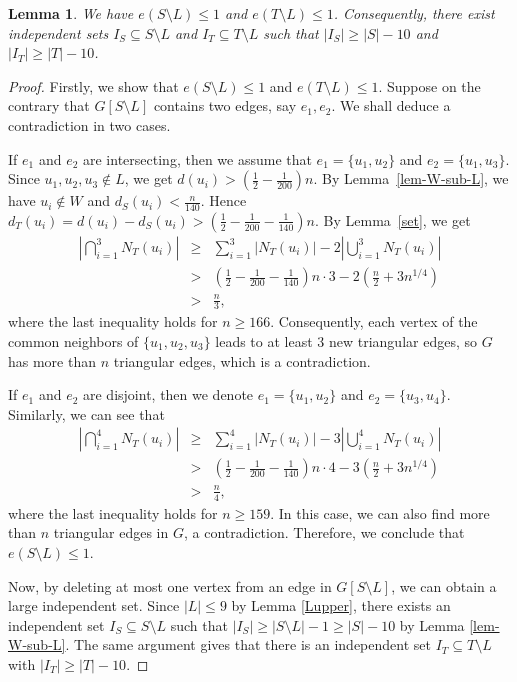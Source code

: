 \documentclass[11pt]{article}
\newtheorem{lemma}[theorem]{Lemma}
\begin{document}
\begin{lemma}  \label{lem-one-edge}
We have 
$e(S\setminus L) \le 1$ and $e(T\setminus L) \le 1$. 
Consequently, 
there exist  independent sets
 $I_S\subseteq S\setminus L$  and $I_T\subseteq T\setminus L$ such that
$ |I_S|\ge  |S|-10$
   and 
$|I_T|\ge |T|-10 $. 
 \end{lemma}

\begin{proof}
Firstly, we show that $e(S\setminus L) \le 1$ and $e(T\setminus L) \le 1$. 
Suppose on the contrary that 
 $G[S\setminus L]$ contains two edges, say $e_1,e_2$.  
 We shall deduce a contradiction in two cases. 
 
If $e_1$ and $e_2$ are intersecting, then we assume that 
$e_1=\{u_1,u_2\}$ and $e_2=\{u_1,u_3\}$. 
Since $u_1, u_2, u_{3} \notin L$, we get  
$d(u_i)> \left(\frac{1}{2}-\frac{1}{200} \right)n$.
By Lemma~\ref{lem-W-sub-L}, we have $u_i \notin W$ and 
$d_S(u_i)<  \frac{n}{140}$. Hence
$d_T(u_i)=d(u_i)-d_S(u_i)> \left(\frac{1}{2}-\frac{1}{200}-\frac{1}{140}\right)n.$
By Lemma~\ref{set}, we  get 
    \begin{eqnarray*}
\left |\bigcap_{i=1}^{3}N_T(u_i) \right| &\ge &  \sum_{i=1}^{3}|N_T(u_i)|-2 \left|\bigcup_{i=1}^{3}N_T(u_i) \right| \\
& > & \left (\frac{1}{2}-\frac{1}{200}-\frac{1}{140} \right)n\cdot 3 - 
2 \left(\frac{n}{2}+ 3n^{1/4} \right) \\
 &>& \frac{n}{3}, 
\end{eqnarray*}
where the last inequality holds for $n\ge 166$. 
Consequently, each vertex of the common neighbors of 
$\{u_1,u_2,u_3\}$ leads to at least $3$ new triangular edges,  so $G$ has more than $n$ triangular edges, which is a contradiction. 


If $e_1$ and $e_2$ are disjoint, then we denote 
$e_1=\{u_1,u_2\}$ and $e_2=\{u_3,u_4\}$. Similarly, we can see that 
    \begin{eqnarray*}
\left |\bigcap_{i=1}^{4}N_T(u_i) \right| &\ge &  \sum_{i=1}^{4}|N_T(u_i)|-3 \left|\bigcup_{i=1}^{4}N_T(u_i) \right| \\
& > & \left (\frac{1}{2}-\frac{1}{200}-\frac{1}{140} \right)n\cdot 4 - 
3 \left(\frac{n}{2}+ 3n^{1/4} \right) \\
 &>& \frac{n}{4}, 
\end{eqnarray*}
where the last inequality holds for $n\ge 159$. 
In this case, we can also find more than $n$ triangular edges in $G$, a contradiction. Therefore, we conclude that $e(S\setminus L) \le 1$. 


Now, by deleting  
at most one vertex from an edge in $G[S\setminus L]$, 
we can obtain 
 a large independent set. Since $|L|\le 9$ 
 by Lemma \ref{Lupper},  
  there exists an independent set
 $I_S\subseteq S\setminus L$ such that
  $
  |I_S|\ge |S\setminus L| - 1 \ge |S|-10$ by Lemma \ref{lem-W-sub-L}. 
 The same argument gives that there  is an independent set $I_T\subseteq T\setminus L$ with
$ |I_T|\ge |T|- 10$.  
 \end{proof}
\end{document}
